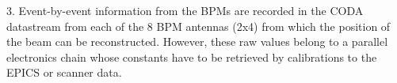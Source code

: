 3. Event-by-event information from the BPMs are recorded in the CODA datastream
from each of the 8 BPM antennas (2x4) from which the position of the beam can be 
reconstructed. However, these raw values belong to a parallel electronics chain 
whose constants have to be retrieved by calibrations to the EPICS or scanner 
data. 


%
%
%

